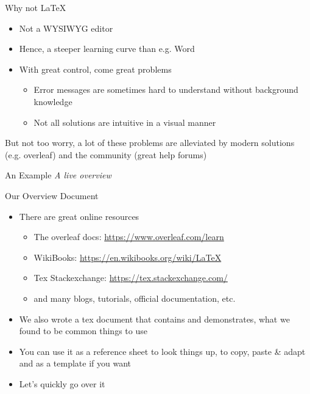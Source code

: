 \documentclass[aspectratio=169]{beamer}
\begin{document}
\begin{frame}{Why not \LaTeX}
    \begin{itemize}
        \item Not a WYSIWYG editor
        \item Hence, a steeper learning curve than e.g. Word
        \item With great control, come great problems
        \begin{itemize}
            \item Error messages are sometimes hard to understand without background knowledge
            \item Not all solutions are intuitive in a visual manner
        \end{itemize}
    \end{itemize}
    But not too worry, a lot of these problems are alleviated by modern solutions (e.g. overleaf) and the community (great help forums) 
\end{frame}

\begin{frame}{An Example}
    \textit{A live overview}
\end{frame}

\begin{frame}{Our Overview Document}
    \begin{itemize}
        \item<1-> There are great online resources
        \begin{itemize}
            \item The overleaf docs: \url{https://www.overleaf.com/learn}
            \item WikiBooks: \url{https://en.wikibooks.org/wiki/LaTeX}
            \item Tex Stackexchange: \url{https://tex.stackexchange.com/}
            \item and many blogs, tutorials, official documentation, etc.
        \end{itemize}
        \item<2-> We also wrote a tex document that contains and demonstrates, what we found to be common things to use
        \item<2-> You can use it as a reference sheet to look things up, to copy, paste \& adapt and as a template if you want
        \item<3-> Let's quickly go over it
    \end{itemize}
\end{frame}
\end{document}
